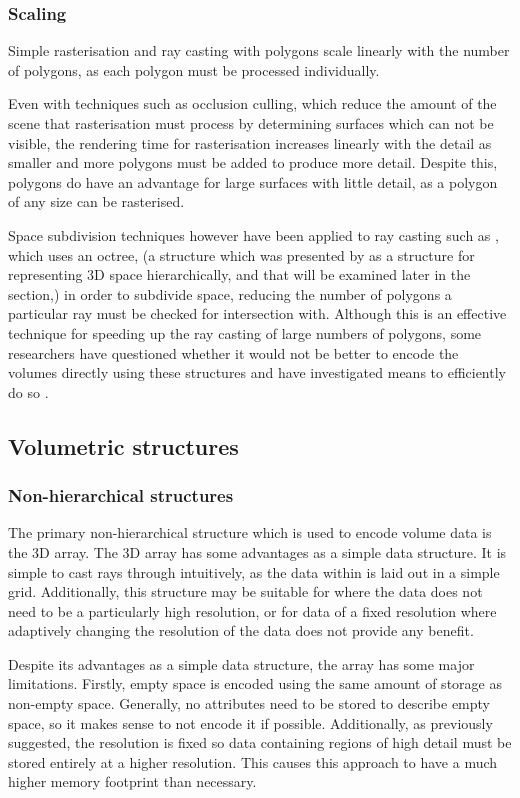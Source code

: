 \subsubsection{Scaling}
Simple rasterisation and ray casting with polygons scale linearly with the number of polygons, as each polygon must be processed individually.

Even with techniques such as occlusion culling, which reduce the amount of the scene that rasterisation must process by determining surfaces which can not be visible, the rendering time for rasterisation increases linearly with the detail as smaller and more polygons must be added to produce more detail. Despite this, polygons do have an advantage for large surfaces with little detail, as a polygon of any size can be rasterised.

Space subdivision techniques however have been applied to ray casting such as \cite{glassner84space}, which uses an octree, (a structure which was presented by \cite{meagher80octree} as a structure for representing 3D space hierarchically, and that will be examined later in the section,) in order to subdivide space, reducing the number of polygons a particular ray must be checked for intersection with. Although this is an effective technique for speeding up the ray casting of large numbers of polygons, some researchers have questioned whether it would not be better to encode the volumes directly using these structures and have investigated means to efficiently do so \parencite{laine10efficientsvos}.

\subsection{Volumetric structures}

\subsubsection{Non-hierarchical structures}
The primary non-hierarchical structure which is used to encode volume data is the 3D array. The 3D array has some advantages as a simple data structure. It is simple to cast rays through intuitively, as the data within is laid out in a simple grid. Additionally, this structure may be suitable for where the data does not need to be a particularly high resolution, or for data of a fixed resolution where adaptively changing the resolution of the data does not provide any benefit.

Despite its advantages as a simple data structure, the array has some major limitations. Firstly, empty space is encoded using the same amount of storage as non-empty space. Generally, no attributes need to be stored to describe empty space, so it makes sense to not encode it if possible. Additionally, as previously suggested, the resolution is fixed so data containing regions of high detail must be stored entirely at a higher resolution. This causes this approach to have a much higher memory footprint than necessary.

